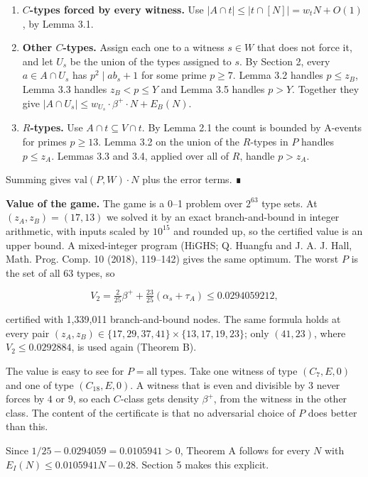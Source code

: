 \documentclass[
  11pt,
]{article}
\providecommand{\tightlist}{%
  \setlength{\itemsep}{0pt}\setlength{\parskip}{0pt}}
\begin{document}
\begin{enumerate}
\def\labelenumi{\arabic{enumi}.}
\tightlist
\item
  \textbf{\(C\)-types forced by every witness.} Use
  \(|A \cap t| \le |t \cap [N]| = w_t N + O(1)\), by Lemma 3.1.
\item
  \textbf{Other \(C\)-types.} Assign each one to a witness \(s \in W\)
  that does not force it, and let \(U_s\) be the union of the types
  assigned to \(s\). By Section 2, every \(a \in A \cap U_s\) has
  \(p^2 \mid ab_s + 1\) for some prime \(p \ge 7\). Lemma 3.2 handles
  \(p \le z_B\), Lemma 3.3 handles \(z_B < p \le Y\) and Lemma 3.5
  handles \(p > Y\). Together they give
  \(|A \cap U_s| \le w_{U_s}\cdot \beta^{+}\cdot N + E_B(N)\).
\item
  \textbf{\(R\)-types.} Use \(A \cap t \subseteq V \cap t\). By Lemma
  2.1 the count is bounded by A-events for primes \(p \ge 13\). Lemma
  3.2 on the union of the \(R\)-types in \(P\) handles \(p \le z_A\).
  Lemmas 3.3 and 3.4, applied over all of \(R\), handle \(p > z_A\).
\end{enumerate}

Summing gives \(\mathrm{val}(P, W)\cdot N\) plus the error terms. ∎

\textbf{Value of the game.} The game is a 0--1 problem over \(2^{63}\)
type sets. At \((z_A, z_B) = (17, 13)\) we solved it by an exact
branch-and-bound in integer arithmetic, with inputs scaled by
\(10^{15}\) and rounded up, so the certified value is an upper bound. A
mixed-integer program (HiGHS; Q. Huangfu and J. A. J. Hall, Math. Prog.
Comp. 10 (2018), 119--142) gives the same optimum. The worst \(P\) is
the set of all 63 types, so

\[V_2 = \tfrac{2}{25}\beta^{+} + \tfrac{23}{25}(\alpha_s+\tau_A) \le 0.0294059212,\]

certified with 1,339,011 branch-and-bound nodes. The same formula holds
at every pair
\((z_A, z_B) \in \{17, 29, 37, 41\} \times \{13, 17, 19, 23\}\); only
\((41, 23)\), where \(V_2 \le 0.0292884\), is used again (Theorem B).

The value is easy to see for \(P = \text{all types}\). Take one witness
of type \((C_7, E, 0)\) and one of type \((C_{18}, E, 0)\). A witness
that is even and divisible by \(3\) never forces by \(4\) or \(9\), so
each \(C\)-class gets density \(\beta^{+}\), from the witness in the
other class. The content of the certificate is that no adversarial
choice of \(P\) does better than this.

Since \(1/25 - 0.0294059 = 0.0105941 > 0\), Theorem A follows for every
\(N\) with \(E_I(N) \le 0.0105941N - 0.28\). Section 5 makes this
explicit.
\end{document}
